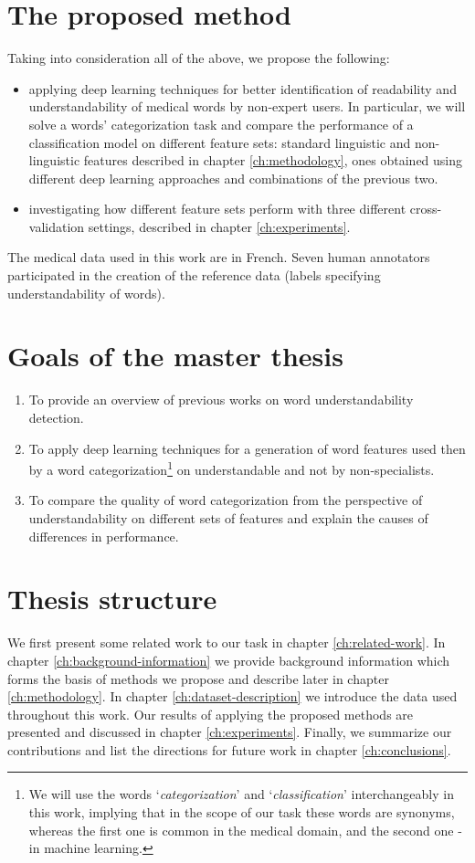 \section{The proposed method}
Taking into consideration all of the above, we propose the following:
\begin{itemize}
    \item applying deep learning techniques for better identification of readability and understandability of medical words by non-expert users. In particular, we will solve a words' categorization task and compare the performance of a classification model on different feature sets: standard linguistic and non-linguistic features described in chapter \ref{ch:methodology}, ones obtained using different deep learning approaches and combinations of the previous two.
    \item investigating how different feature sets perform with three different cross-validation settings, described in chapter \ref{ch:experiments}. 
\end{itemize}
The medical data used in this work are in French. Seven human annotators participated in the creation of the reference data (labels specifying understandability of words).

\section{Goals of the master thesis}
\begin{enumerate}
    \item To provide an overview of previous works on word understandability detection.
    
    \item To apply deep learning techniques for a generation of word features used then by a word categorization\footnote{We will use the words `\textit{categorization}' and `\textit{classification}' interchangeably in this work, implying that in the scope of our task these words are synonyms, whereas the first one is common in the medical domain, and the second one - in machine learning.} on understandable and not by non-specialists.
    
    \item To compare the quality of word categorization from the perspective of understandability on different sets of features and explain the causes of differences in performance.
\end{enumerate}

\section{Thesis structure}
We first present some related work to our task in chapter \ref{ch:related-work}. 
In chapter \ref{ch:background-information} we provide background information which forms the basis of methods we propose and describe later in chapter \ref{ch:methodology}. 
In chapter \ref{ch:dataset-description} we introduce the data used throughout this work. 
Our results of applying the proposed methods are presented and discussed in chapter \ref{ch:experiments}. 
Finally, we summarize our contributions and list the directions for future work in chapter \ref{ch:conclusions}.